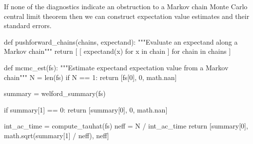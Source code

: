 \documentclass[
  letterpaper,
  DIV=11,
  numbers=noendperiod]{scrartcl}
\newenvironment{Shaded}{\begin{snugshade}}{\end{snugshade}}
\newcommand{\BuiltInTok}[1]{\textcolor[rgb]{0.00,0.23,0.31}{#1}}
\newcommand{\CommentTok}[1]{\textcolor[rgb]{0.37,0.37,0.37}{#1}}
\newcommand{\ControlFlowTok}[1]{\textcolor[rgb]{0.00,0.23,0.31}{#1}}
\newcommand{\DecValTok}[1]{\textcolor[rgb]{0.68,0.00,0.00}{#1}}
\newcommand{\KeywordTok}[1]{\textcolor[rgb]{0.00,0.23,0.31}{#1}}
\newcommand{\NormalTok}[1]{\textcolor[rgb]{0.00,0.23,0.31}{#1}}
\newcommand{\OperatorTok}[1]{\textcolor[rgb]{0.37,0.37,0.37}{#1}}
\begin{document}
If none of the diagnostics indicate an obstruction to a Markov chain
Monte Carlo central limit theorem then we can construct expectation
value estimates and their standard errors.

\begin{Shaded}
\begin{Highlighting}[]
\KeywordTok{def}\NormalTok{ pushforward\_chains(chains, expectand):}
  \CommentTok{"""Evaluate an expectand along a Markov chain"""}
  \ControlFlowTok{return}\NormalTok{ [ [ expectand(x) }\ControlFlowTok{for}\NormalTok{ x }\KeywordTok{in}\NormalTok{ chain ] }\ControlFlowTok{for}\NormalTok{ chain }\KeywordTok{in}\NormalTok{ chains ]}
\end{Highlighting}
\end{Shaded}

\begin{Shaded}
\begin{Highlighting}[]
\KeywordTok{def}\NormalTok{ mcmc\_est(fs):}
  \CommentTok{"""Estimate expectand expectation value from a Markov chain"""}
\NormalTok{  N }\OperatorTok{=} \BuiltInTok{len}\NormalTok{(fs)}
  \ControlFlowTok{if}\NormalTok{ N }\OperatorTok{==} \DecValTok{1}\NormalTok{:}
    \ControlFlowTok{return}\NormalTok{ [fs[}\DecValTok{0}\NormalTok{], }\DecValTok{0}\NormalTok{, math.nan]}
  
\NormalTok{  summary }\OperatorTok{=}\NormalTok{ welford\_summary(fs)}
  
  \ControlFlowTok{if}\NormalTok{ summary[}\DecValTok{1}\NormalTok{] }\OperatorTok{==} \DecValTok{0}\NormalTok{:}
    \ControlFlowTok{return}\NormalTok{ [summary[}\DecValTok{0}\NormalTok{], }\DecValTok{0}\NormalTok{, math.nan]}
  
\NormalTok{  int\_ac\_time }\OperatorTok{=}\NormalTok{ compute\_tauhat(fs)}
\NormalTok{  neff }\OperatorTok{=}\NormalTok{ N }\OperatorTok{/}\NormalTok{ int\_ac\_time}
  \ControlFlowTok{return}\NormalTok{ [summary[}\DecValTok{0}\NormalTok{], math.sqrt(summary[}\DecValTok{1}\NormalTok{] }\OperatorTok{/}\NormalTok{ neff), neff]}
\end{Highlighting}
\end{Shaded}
\end{document}
